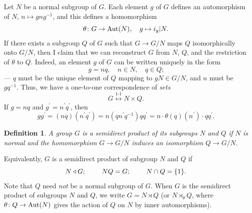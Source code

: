 \documentclass[a4paper,11pt,final]{memoir}%
\newtheorem{definition}[X]{Definition}
\theoremstyle{nonumberplain}
\begin{document}
Let $N$ be a normal subgroup of $G$. Each element $g$ of $G$ defines an
automorphism of $N$, $n\mapsto gng^{-1}$, and this defines a homomorphism
\[
\theta\colon G\rightarrow\operatorname{Aut}(N),\quad g\mapsto i_{g}|N.
\]
If there exists a subgroup $Q$ of $G$ such that $G\rightarrow G/N$ maps $Q$
isomorphically onto $G/N$, then I claim that we can reconstruct $G$ from $N$,
$Q$, and the restriction of $\theta$ to $Q$. Indeed, an element $g$ of $G$ can
be written uniquely in the form%
\[
g=nq,\quad n\in N,\quad q\in Q\text{;}%
\]
--- $q$ must be the unique element of $Q$ mapping to $gN\in G/N$, and $n$ must
be $gq^{-1}$. Thus, we have a one-to-one correspondence of \textit{sets}
\[
G\overset{\text{1-1}}{\longleftrightarrow}N\times Q.
\]
If $g=nq$ and $g^{\prime}=n^{\prime}q^{\prime}$, then
\[
gg^{\prime}=\left(  nq\right)  \left(  n^{\prime}q^{\prime}\right)
=n(qn^{\prime}q^{-1})qq^{\prime}=n\cdot\theta(q)(n^{\prime})\cdot qq^{\prime
}.
\]


\begin{definition}
\label{it13} A group $G$ is a \emph{semidirect product\/}%
of its subgroups $N$ and $Q$ if $N$ is normal and the homomorphism
$G\rightarrow G/N$ induces an isomorphism $Q\rightarrow G/N$.
\end{definition}

Equivalently, $G$ is a semidirect product of subgroup $N$ and $Q$ if
\begin{equation}
N\triangleleft G\text{; \hspace{0.3in}}NQ=G\text{;\hspace{0.3in} }N\cap
Q=\{1\}. \label{e33}%
\end{equation}
Note that $Q$ need \textit{not\/} be a normal subgroup of $G$. When $G$ is the
semidirect product of subgroups $N$ and $Q$, we write $G=N\rtimes Q$ (or
$N\rtimes_{\theta}Q$, where $\theta\colon Q\rightarrow\operatorname{Aut}(N)$ gives the
action of $Q$ on $N$ by inner automorphisms).
\end{document}
